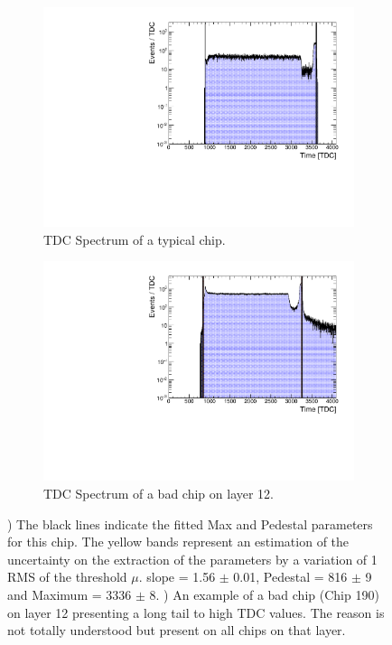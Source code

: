 \begin{figure}[htbp!]
	\begin{subfigure}[t]{0.5\textwidth}
		\centering
		\includegraphics[width=1\linewidth]{../Thesis_Plots/Timing/Muons/Plots/ExampleTDCSpectra}
		\caption{TDC Spectrum of a typical chip.} \label{fig:TDC_Spectrum}
	\end{subfigure}
	\hfill
	\begin{subfigure}[t]{0.5\textwidth}
		\centering
		\includegraphics[width=1\linewidth]{../Thesis_Plots/Timing/Muons/Plots/BadTDCSpectra_Layer12}
		\caption{TDC Spectrum of a bad chip on layer 12.} \label{fig:TDC_Spectrum_bad}
	\end{subfigure}
	\caption{) The black lines indicate the fitted Max and Pedestal parameters for this chip. The yellow bands represent an estimation of the uncertainty on the extraction of the parameters by a variation of 1 RMS of the threshold $\mu$. slope = 1.56 $\pm$ 0.01, Pedestal = 816 $\pm$ 9 and Maximum = 3336 $\pm$ 8. ) An example of a bad chip (Chip 190) on layer 12 presenting a long tail to high TDC values. The reason is not totally understood but present on all chips on that layer.}
\end{figure}
